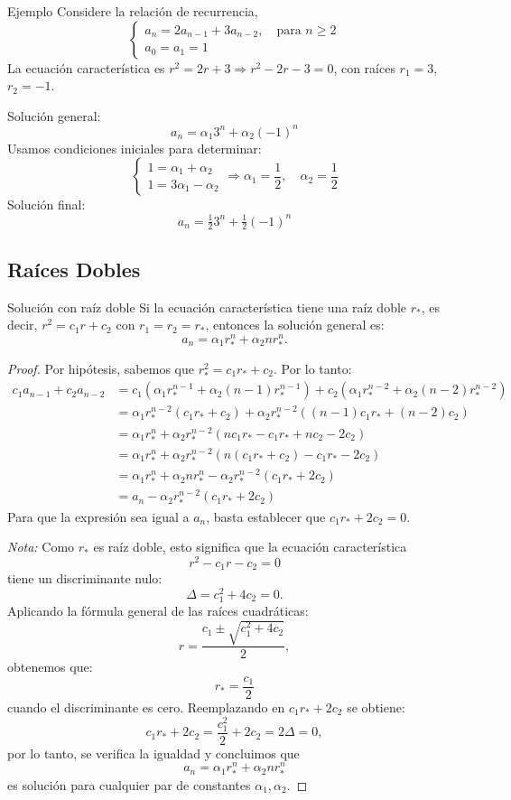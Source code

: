 \begin{exampleblock}{Ejemplo}
Considere la relación de recurrencia,
\[
\begin{cases}
a_n = 2a_{n-1} + 3a_{n-2}, \quad \text{para } n \geq 2 \\
a_0 = a_1 = 1
\end{cases}
\]
La ecuación característica es $r^2 = 2r + 3 \Rightarrow r^2 - 2r - 3 = 0$, con raíces $r_1 = 3$, $r_2 = -1$.

Solución general:
\[
a_n = \alpha_1 3^n + \alpha_2 (-1)^n
\]
Usamos condiciones iniciales para determinar:
\[
\begin{cases}
1 = \alpha_1 + \alpha_2 \\
1 = 3\alpha_1 - \alpha_2
\end{cases}
\Rightarrow \alpha_1 = \frac{1}{2}, \quad \alpha_2 = \frac{1}{2}
\]
Solución final:
\[
a_n = \tfrac{1}{2} 3^n + \tfrac{1}{2} (-1)^n
\]
\end{exampleblock}

\subsection{Raíces Dobles}

\begin{thmblock}{Solución con raíz doble}
Si la ecuación característica tiene una raíz doble $r_*$, es decir, $r^2 = c_1 r + c_2$ con $r_1 = r_2 = r_*$, entonces la solución general es:
\[
a_n = \alpha_1 r_*^n + \alpha_2 n r_*^n.
\]
\end{thmblock}
\begin{proof}
Por hipótesis, sabemos que $r_*^2 = c_1 r_* + c_2$. Por lo tanto:
\begin{align*}
c_1 a_{n-1} + c_2 a_{n-2} &= c_1(\alpha_1 r_*^{n-1} + \alpha_2 (n-1) r_*^{n-1}) + c_2(\alpha_1 r_*^{n-2} + \alpha_2 (n-2) r_*^{n-2}) \\
&= \alpha_1 r_*^{n-2} (c_1 r_* + c_2) + \alpha_2 r_*^{n-2} ((n-1) c_1 r_* + (n-2) c_2) \\
&= \alpha_1 r_*^n + \alpha_2 r_*^{n-2} (n c_1 r_* - c_1 r_* + n c_2 - 2 c_2) \\
&= \alpha_1 r_*^n + \alpha_2 r_*^{n-2} (n(c_1 r_* + c_2) - c_1 r_* - 2c_2) \\
&= \alpha_1 r_*^n + \alpha_2 n r_*^n - \alpha_2 r_*^{n-2}(c_1 r_* + 2c_2) \\
&= a_n - \alpha_2 r_*^{n-2}(c_1 r_* + 2c_2)
\end{align*}
Para que la expresión sea igual a $a_n$, basta establecer que $c_1 r_* + 2c_2 = 0$.

\noindent \textit{Nota:} Como $r_*$ es raíz doble, esto significa que la ecuación característica
\[
r^2 - c_1 r - c_2 = 0
\]
tiene un discriminante nulo:
\[
\Delta = c_1^2 + 4c_2 = 0.
\]
Aplicando la fórmula general de las raíces cuadráticas:
\[
r = \frac{c_1 \pm \sqrt{c_1^2 + 4c_2}}{2},
\]
obtenemos que:
\[
r_* = \frac{c_1}{2}
\]
cuando el discriminante es cero. Reemplazando en $c_1 r_* + 2c_2$ se obtiene:
\[
c_1 r_* + 2c_2 = \frac{c_1^2}{2} + 2c_2 = 2\Delta =  0,
\]
por lo tanto, se verifica la igualdad y concluimos que
\[
a_n = \alpha_1 r_*^n + \alpha_2 n r_*^n
\]
es solución para cualquier par de constantes $\alpha_1, \alpha_2$.
\end{proof}


